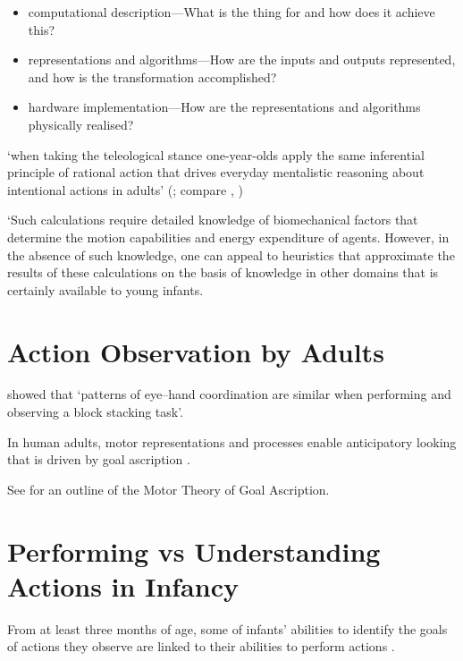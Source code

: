 \documentclass[12pt]{extarticle}
\begin{document}
\begin{multicols}{3}
\begin{itemize}

\item computational description---What is the thing for and how does it achieve this?

\item representations and algorithms---How are the inputs and outputs represented, and how is the transformation accomplished?

\item hardware implementation---How are the representations and algorithms physically realised?

\end{itemize}

‘when taking the teleological stance one-year-olds apply the same
inferential principle of rational action that drives everyday mentalistic
reasoning about intentional actions in adults’
(\citealp{Gergely:2003gb}; compare \citealp{Csibra:2003jv}, \citealp[p.~259]{Csibra:1998cx} )

`Such calculations require detailed knowledge of biomechanical factors that determine the motion capabilities and energy expenditure of agents.  However, in the absence of such knowledge, one can appeal to heuristics  that approximate the results of these calculations on the basis of knowledge in other domains that is certainly available to young infants.



\section{Action Observation by Adults}

\citet{Flanagan:2003lm} showed that
‘patterns of eye–hand coordination are similar when performing and observing a block stacking task’.

In human adults, motor representations and processes enable anticipatory looking
that is driven by goal ascription \citep[e.g.][]{Costantini:2012fk,ambrosini:2012_tie}.

See \citet{sinigaglia:2015_goal_ascription} for an outline of the Motor Theory of Goal Ascription.



\section{Performing vs Understanding Actions in Infancy}

From at least three months of age, some of infants’ abilities to identify
the goals of actions they observe are linked to their abilities to perform
actions \citep{woodward:2009_infants}.


\end{multicols}
\end{document}
